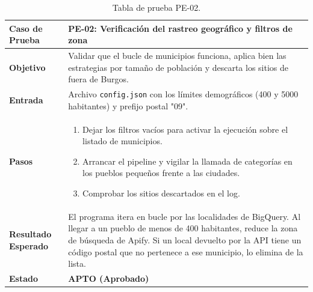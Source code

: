 \begin{table}[p]
	\centering
	\begin{tabularx}{\linewidth}{ p{} X }
		\toprule
		\textbf{Caso de Prueba} & \textbf{PE-02: Verificación del rastreo geográfico y filtros de zona} \\
		\toprule
		\textbf{Objetivo}       & Validar que el bucle de municipios funciona, aplica bien las estrategias por tamaño de población y descarta los sitios de fuera de Burgos. \\ \midrule
		\textbf{Entrada}        & Archivo \texttt{config.json} con los límites demográficos (400 y 5000 habitantes) y prefijo postal "09". \\ \midrule
		\textbf{Pasos}          & 
		\begin{enumerate}
			\tightlist
			\item Dejar los filtros vacíos para activar la ejecución sobre el listado de municipios.
			\item Arrancar el pipeline y vigilar la llamada de categorías en los pueblos pequeños frente a las ciudades.
			\item Comprobar los sitios descartados en el log.
		\end{enumerate} \\ \midrule
		\textbf{Resultado Esperado} & El programa itera en bucle por las localidades de BigQuery. Al llegar a un pueblo de menos de 400 habitantes, reduce la zona de búsqueda de Apify. Si un local devuelto por la API tiene un código postal que no pertenece a ese municipio, lo elimina de la lista. \\ \midrule
		\textbf{Estado}         & \textbf{APTO (Aprobado)} \\
		\bottomrule
	\end{tabularx}
	\caption{Tabla de prueba PE-02.}
\end{table}

